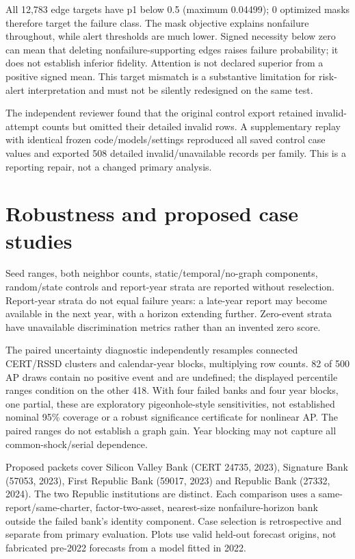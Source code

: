 \documentclass[11pt]{article}
\begin{document}
All 12,783 edge targets have p1 below 0.5 (maximum 0.04499); 0 optimized masks therefore target the failure class. The mask objective explains nonfailure throughout, while alert thresholds are much lower. Signed necessity below zero can mean that deleting nonfailure-supporting edges raises failure probability; it does not establish inferior fidelity. Attention is not declared superior from a positive signed mean. This target mismatch is a substantive limitation for risk-alert interpretation and must not be silently redesigned on the same test.

The independent reviewer found that the original control export retained invalid-attempt counts but omitted their detailed invalid rows. A supplementary replay with identical frozen code/models/settings reproduced all saved control case values and exported 508 detailed invalid/unavailable records per family. This is a reporting repair, not a changed primary analysis.

\section{Robustness and proposed case studies}
Seed ranges, both neighbor counts, static/temporal/no-graph components, random/state controls and report-year strata are reported without reselection. Report-year strata do not equal failure years: a late-year report may become available in the next year, with a horizon extending further. Zero-event strata have unavailable discrimination metrics rather than an invented zero score.

The paired uncertainty diagnostic independently resamples connected CERT/RSSD clusters and calendar-year blocks, multiplying row counts. 82 of 500 AP draws contain no positive event and are undefined; the displayed percentile ranges condition on the other 418. With four failed banks and four year blocks, one partial, these are exploratory pigeonhole-style sensitivities, not established nominal 95\% coverage or a robust significance certificate for nonlinear AP. The paired ranges do not establish a graph gain. Year blocking may not capture all common-shock/serial dependence.

Proposed packets cover Silicon Valley Bank (CERT 24735, 2023), Signature Bank (57053, 2023), First Republic Bank (59017, 2023) and Republic Bank (27332, 2024). The two Republic institutions are distinct. Each comparison uses a same-report/same-charter, factor-two-asset, nearest-size nonfailure-horizon bank outside the failed bank's identity component. Case selection is retrospective and separate from primary evaluation. Plots use valid held-out forecast origins, not fabricated pre-2022 forecasts from a model fitted in 2022.
\end{document}
